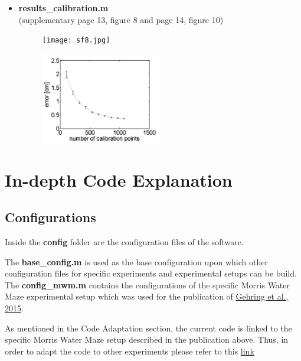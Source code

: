 \documentclass[12pt,titlepage]{article}
\begin{document}
\begin{doublespace}
\begin{itemize}
\item \textbf{results\_calibration.m}\\
(supplementary page 13, figure 8 and page 14, figure 10)
\begin{figure}[H]
	\begin{center}
		\texttt{[image: sf8.jpg]}\\
		\label{code_sfig8}
	\end{center}
\end{figure}
\begin{figure}[H]
	\begin{center}
		\includegraphics[width=0.5\textwidth]{sf10.jpg}\\
		\label{code_sfig10}
	\end{center}
\end{figure}

\end{itemize}


\section{In-depth Code Explanation}

\subsection{Configurations}
Inside the \textbf{config} folder are the configuration files of the software.

The \textbf{base\_config.m} is used as the base configuration upon which other configuration files for specific experiments and experimental setups can be build. The \textbf{config\_mwm.m} contains the configurations of the specific Morris Water Maze experimental setup which was used for the publication of \href{http://www.nature.com/articles/srep14562}{Gehring et al., 2015}.

As mentioned in the Code Adaptation section, the current code is linked to the specific Morris Water Maze setup described in the publication above. Thus, in order to adapt the code to other experiments please refer to this \href{https://github.com/RodentDataAnalytics/roda}{link}


\end{doublespace}
\end{document}
